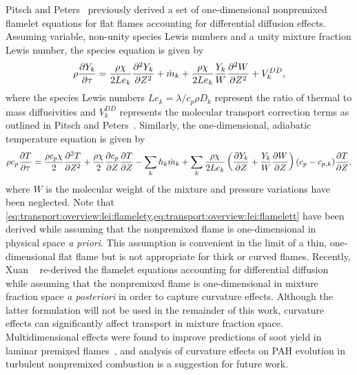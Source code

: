 Pitsch and Peters~\cite{pitsch1998} previously derived a set of one-dimensional nonpremixed flamelet equations for flat flames accounting for differential diffusion effects. Assuming variable, non-unity species Lewis numbers and a unity mixture fraction Lewis number, the species equation is given by
\begin{equation}\label{eq:transport:overview:lei:flamelety}
  \rho\pder[Y_k]{\tau} = \frac{\rho\chi}{2 Le_k}\sder[Y_k]{Z} + \dot{m}_k + \frac{\rho\chi}{2 Le_k}\frac{Y_k}{W}\sder[W]{Z} + V_k^{DD},
\end{equation}
where the species Lewis numbers $Le_k = \lambda/c_p\rho D_k$ represent the ratio of thermal to mass diffusivities and $V_k^{DD}$ represents the molecular transport correction terms as outlined in Pitsch and Peters~\cite{pitsch1998}. Similarly, the one-dimensional, adiabatic temperature equation is given by
\begin{equation}\label{eq:transport:overview:lei:flamelett}
  \rho c_p \pder[T]{\tau} = \frac{\rho c_p \chi}{2}\sder[T]{Z} + \frac{\rho\chi}{2}\pder[c_p]{Z}\pder[T]{Z} - \sum\limits_{k} h_k\dot{m}_k + \sum\limits_{k} \frac{\rho\chi}{2 Le_k}\left( \pder[Y_k]{Z} + \frac{Y_k}{W}\pder[W]{Z} \right)(c_p - c_{p,k})\pder[T]{Z},
\end{equation}
where $W$ is the molecular weight of the mixture and pressure variations have been neglected. Note that \cref{eq:transport:overview:lei:flamelety,eq:transport:overview:lei:flamelett} have been derived while assuming that the nonpremixed flame is one-dimensional in physical space \textit{a priori}. This assumption is convenient in the limit of a thin, one-dimensional flat flame but is not appropriate for thick or curved flames. Recently, Xuan \etal~\cite{xuan2014} re-derived the flamelet equations accounting for differential diffusion while assuming that the nonpremixed flame is one-dimensional in mixture fraction space \textit{a posteriori} in order to capture curvature effects. Although the latter formulation will not be used in the remainder of this work, curvature effects can significantly affect transport in mixture fraction space. Multidimensional effects were found to improve predictions of soot yield in laminar premixed flames~\cite{xuan2016}, and analysis of curvature effects on PAH evolution in turbulent nonpremixed combustion is a suggestion for future work.

